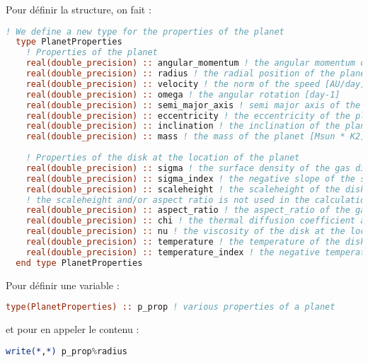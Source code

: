 Pour définir la structure, on fait : 
\begin{lstlisting}[language=Fortran]
  ! We define a new type for the properties of the planet
  type PlanetProperties
    ! Properties of the planet
    real(double_precision) :: angular_momentum ! the angular momentum of the planet [Ms.AU^2.day^-1]
    real(double_precision) :: radius ! the radial position of the planet [AU]
    real(double_precision) :: velocity ! the norm of the speed [AU/day]
    real(double_precision) :: omega ! the angular rotation [day-1]
    real(double_precision) :: semi_major_axis ! semi major axis of the planet [AU]
    real(double_precision) :: eccentricity ! the eccentricity of the planet
    real(double_precision) :: inclination ! the inclination of the planet [rad]
    real(double_precision) :: mass ! the mass of the planet [Msun * K2]
    
    ! Properties of the disk at the location of the planet
    real(double_precision) :: sigma ! the surface density of the gas disk at the planet location [MSUN.AU^-2]
    real(double_precision) :: sigma_index ! the negative slope of the surface density profile at the location of the planet.
    real(double_precision) :: scaleheight ! the scaleheight of the disk at the location of the planet [AU]
    ! the scaleheight and/or aspect ratio is not used in the calculation of the turbulence, where the value 0.05 is used directly into the code
    real(double_precision) :: aspect_ratio ! the aspect_ratio of the gas disk at the location of the planet [no dim]
    real(double_precision) :: chi ! the thermal diffusion coefficient at the location of the planet [AU^2.day^-1]
    real(double_precision) :: nu ! the viscosity of the disk at the location of the planet [AU^2.day^-1]
    real(double_precision) :: temperature ! the temperature of the disk at the location of the planet [K] 
    real(double_precision) :: temperature_index ! the negative temperature index of the disk at the location of the planet [no dim] 
  end type PlanetProperties
\end{lstlisting}

Pour définir une variable : 
\begin{lstlisting}[language=Fortran]
  type(PlanetProperties) :: p_prop ! various properties of a planet
\end{lstlisting}
et pour en appeler le contenu : 
\begin{lstlisting}[language=Fortran]
write(*,*) p_prop%radius
\end{lstlisting}



